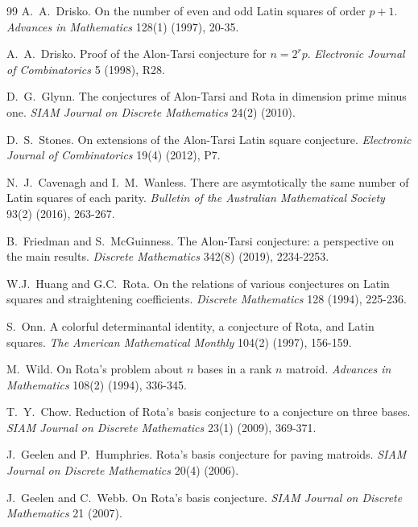\documentclass[11pt]{amsart}
\begin{document}
\begin{thebibliography}{99}
A.~A.~Drisko.
\newblock On the number of even and odd Latin squares of order $p+1$.
\newblock \emph{Advances in Mathematics} 128(1) (1997), 20-35.

A.~A.~Drisko.
\newblock Proof of the Alon-Tarsi conjecture for $n=2^r p$.
\newblock \emph{Electronic Journal of Combinatorics} 5 (1998), R28.

D.~G.~Glynn.
\newblock The conjectures of Alon-Tarsi and Rota in dimension prime minus one.
\newblock \emph{SIAM Journal on Discrete Mathematics} 24(2) (2010).

D.~S.~Stones.
\newblock On extensions of the Alon-Tarsi Latin square conjecture.
\newblock \emph{Electronic Journal of Combinatorics} 19(4) (2012), P7.

N.~J.~Cavenagh and I.~M.~Wanless.
\newblock There are asymtotically the same number of Latin squares of each parity.
\newblock \emph{Bulletin of the Australian Mathematical Society} 93(2) (2016), 263-267.

B.~Friedman and S.~McGuinness.
\newblock The Alon-Tarsi conjecture: a perspective on the main results.
\newblock \emph{Discrete Mathematics} 342(8) (2019), 2234-2253.

W.J.~Huang and G.C.~Rota.
\newblock On the relations of various conjectures on Latin squares and straightening coefficients.
\newblock \emph{Discrete Mathematics} 128 (1994), 225-236.

S.~Onn.
\newblock A colorful determinantal identity, a conjecture of Rota, and Latin squares.
\newblock \emph{The American Mathematical Monthly} 104(2) (1997), 156-159.

M.~Wild.
\newblock On Rota's problem about $n$ bases in a rank $n$ matroid.
\newblock \emph{Advances in Mathematics} 108(2) (1994), 336-345.

T.~Y.~Chow.
\newblock Reduction of Rota's basis conjecture to a conjecture on three bases.
\newblock \emph{SIAM Journal on Discrete Mathematics} 23(1) (2009), 369-371.

J.~Geelen and P.~Humphries.
\newblock Rota's basis conjecture for paving matroids.
\newblock \emph{SIAM Journal on Discrete Mathematics} 20(4) (2006).

J.~Geelen and C.~Webb.
\newblock On Rota's basis conjecture.
\newblock \emph{SIAM Journal on Discrete Mathematics} 21 (2007).


\end{thebibliography}
\end{document}

